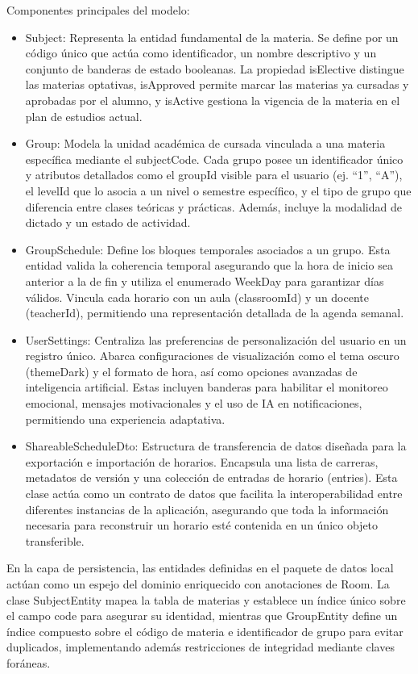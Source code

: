 Componentes principales del modelo:
\begin{itemize}
  \item Subject: Representa la entidad fundamental de la materia. Se define por un código único que actúa como identificador, un nombre descriptivo y un conjunto de banderas de estado booleanas. La propiedad isElective distingue las materias optativas, isApproved permite marcar las materias ya cursadas y aprobadas por el alumno, y isActive gestiona la vigencia de la materia en el plan de estudios actual.
  \item Group: Modela la unidad académica de cursada vinculada a una materia específica mediante el subjectCode. Cada grupo posee un identificador único y atributos detallados como el groupId visible para el usuario (ej. ``1'', ``A''), el levelId que lo asocia a un nivel o semestre específico, y el tipo de grupo que diferencia entre clases teóricas y prácticas. Además, incluye la modalidad de dictado y un estado de actividad.
  \item GroupSchedule: Define los bloques temporales asociados a un grupo. Esta entidad valida la coherencia temporal asegurando que la hora de inicio sea anterior a la de fin y utiliza el enumerado WeekDay para garantizar días válidos. Vincula cada horario con un aula (classroomId) y un docente (teacherId), permitiendo una representación detallada de la agenda semanal.
  \item UserSettings: Centraliza las preferencias de personalización del usuario en un registro único. Abarca configuraciones de visualización como el tema oscuro (themeDark) y el formato de hora, así como opciones avanzadas de inteligencia artificial. Estas incluyen banderas para habilitar el monitoreo emocional, mensajes motivacionales y el uso de IA en notificaciones, permitiendo una experiencia adaptativa.
  \item ShareableScheduleDto: Estructura de transferencia de datos diseñada para la exportación e importación de horarios. Encapsula una lista de carreras, metadatos de versión y una colección de entradas de horario (entries). Esta clase actúa como un contrato de datos que facilita la interoperabilidad entre diferentes instancias de la aplicación, asegurando que toda la información necesaria para reconstruir un horario esté contenida en un único objeto transferible.
\end{itemize}

En la capa de persistencia, las entidades definidas en el paquete de datos local actúan como un espejo del dominio enriquecido con anotaciones de Room. La clase SubjectEntity mapea la tabla de materias y establece un índice único sobre el campo code para asegurar su identidad, mientras que GroupEntity define un índice compuesto sobre el código de materia e identificador de grupo para evitar duplicados, implementando además restricciones de integridad mediante claves foráneas.

